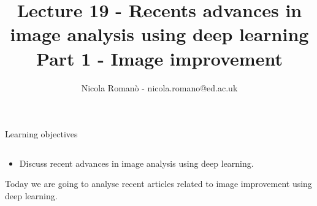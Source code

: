 \documentclass[9pt, aspectratio=169]{beamer}
\author{Nicola Roman\`o - nicola.romano@ed.ac.uk}
\title{Lecture 19 - Recents advances in image analysis using deep learning\\\small Part 1 - Image improvement}
\date{}
\begin{document}

\begin{frame}
    \titlepage
\end{frame}

\begin{frame}
    {Learning objectives}
    \begin{columns}
        \begin{column}{0.8\textwidth}
            \begin{itemize}
                \item Discuss recent advances in image analysis using deep learning.
            \end{itemize}

            \pause
            \vspace{2em}

            Today we are going to analyse recent articles related to image improvement using deep learning.


\end{column}
\end{columns}
\end{frame}
\end{document}
